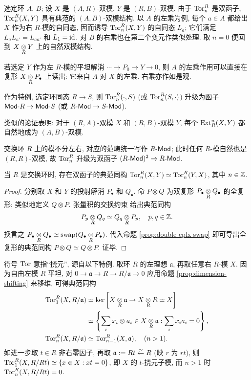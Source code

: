 \begin{remark}[双模结构]\label{rem:ExtTor-bimodule}
	选定环 $A$, $B$; 设 $X$ 是 $(A, R)$-双模, $Y$ 是 $(R, B)$-双模. 由于 $\operatorname{Tor}^R_n$ 是双函子, $\operatorname{Tor}^R_n(X, Y)$ 具有典范的 $(A, B)$-双模结构. 以 $A$ 的左乘为例, 每个 $a \in A$ 都给出 $X$ 作为右 $R$-模的自同态, 因而诱导 $\operatorname{Tor}^R_n(X, Y)$ 的自同态 $L_a$; 它们满足 $L_a L_{a'} = L_{aa'}$ 和 $L_1 = \mathrm{id}$. 对 $B$ 的右乘也在第二个变元作类似处理. 取 $n=0$ 便回到 $X \underset{R}{\otimes} Y$ 上的自然双模结构.
	
	若选定 $Y$ 作为左 $R$-模的平坦解消 $\cdots \to P_0 \to Y \to 0$, 则 $A$ 的左乘作用可以直接在复形 $X \underset{R}{\otimes} P_\bullet$ 上读出: 它来自 $A$ 对 $X$ 的左乘. 右乘亦作如是观.

	作为特例, 选定环同态 $R \to S$, 则 $\operatorname{Tor}^R_n(\cdot, S)$ (或 $\operatorname{Tor}^R_n(S, \cdot)$) 升级为函子 $\mathsf{Mod}\text{-}R \to \mathsf{Mod}\text{-}S$ (或 $R\text{-}\mathsf{Mod} \to S\text{-}\mathsf{Mod}$).

	类似的论证表明: 对于 $(R, A)$-双模 $X$ 和 $(R, B)$-双模 $Y$, 每个 $\operatorname{Ext}^n_R(X, Y)$ 都自然地成为 $(A, B)$-双模.
\end{remark}

交换环 $R$ 上的模不分左右, 对应的范畴统一写作 $R\text{-}\mathsf{Mod}$; 此时任何 $R$-模自然也是 $(R, R)$-双模, 故 $\operatorname{Tor}^R_n$ 升级为双函子 $(R\text{-}\mathsf{Mod})^2 \to R\text{-}\mathsf{Mod}$.

\begin{proposition}\label{prop:Tor-symmetry}
	当 $R$ 是交换环时, 存在双函子的典范同构 $\operatorname{Tor}_n^R(X, Y) \simeq \operatorname{Tor}_n^R(Y, X)$, 其中 $n \in \mathbb{Z}$.
\end{proposition}
\begin{proof}
	分别取 $X$ 和 $Y$ 的投射解消 $P_\bullet$ 和 $Q_\bullet$. 命 $P \otimes Q$ 为双复形 $P_\bullet \underset{R}{\otimes} Q_\bullet$ 的全复形; 类似地定义 $Q \otimes P$. 张量积的交换约束 \cite[命题 6.5.14]{Li1} 给出典范同构
	\[ P_p \underset{R}{\otimes} Q_q \simeq Q_q \underset{R}{\otimes} P_p, \quad p, q \in \mathbb{Z}. \]
	换言之 $P_\bullet \underset{R}{\otimes} Q_\bullet \simeq \mathrm{swap}(Q_\bullet \underset{R}{\otimes} P_\bullet)$. 代入命题 \ref{prop:double-cplx-swap} 即可导出全复形的典范同构 $P \otimes Q \simeq Q \otimes P$. 证毕.
\end{proof}

\begin{remark}
	符号 $\operatorname{Tor}$ 意指``挠元'', 源自以下特例. 取环 $R$ 的左理想 $\mathfrak{a}$, 再取任意右 $R$-模 $X$. 因为自由左模 $R$ 平坦, 对 $0 \to \mathfrak{a} \to R \to R/\mathfrak{a} \to 0$ 应用命题 \ref{prop:dimension-shifting} 来移维, 可得典范同构
	\begin{align*}
		\operatorname{Tor}^R_1(X, R/\mathfrak{a}) & \simeq \operatorname{ker}\left[ X \underset{R}{\otimes} \mathfrak{a} \to X \underset{R}{\otimes} R \simeq X \right] \\
		& \simeq \left\{ \sum_i x_i \otimes a_i \in X \underset{R}{\otimes} \mathfrak{a} : \sum_i x_i a_i = 0 \right\}, \\
		\operatorname{Tor}^R_n(X, R/\mathfrak{a}) & \simeq \operatorname{Tor}^R_{n-1}(X, \mathfrak{a}), \quad (n > 1).
	\end{align*}
	如进一步取 $t \in R$ 非右零因子, 再取 $\mathfrak{a} := Rt \stackrel{\sim}{\leftarrow} R$ (映 $r$ 为 $rt$), 则 $\operatorname{Tor}^R_1(X, R/Rt) \simeq \left\{ x \in X: xt = 0 \right\}$, 即 $X$ 的 $t$-挠元子模, 而 $n > 1$ 时 $\operatorname{Tor}^R_n(X, R/Rt) = 0$.
\end{remark}

